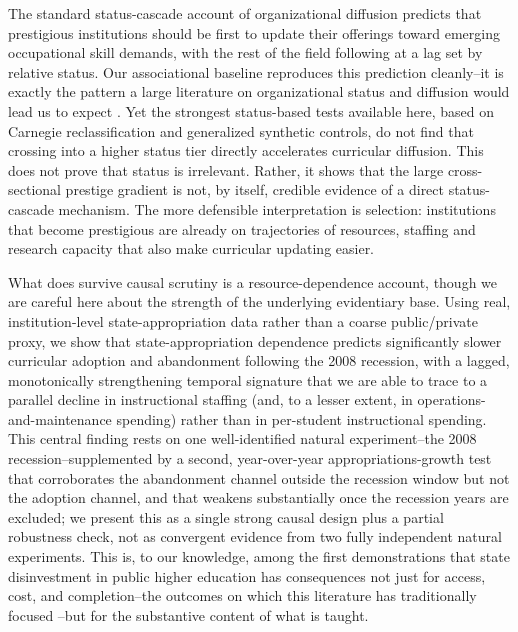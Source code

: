 \documentclass[11pt, letterpaper]{article}
\newcommand{\parencite}[1]{\cite{#1}}
\begin{document}
The standard status-cascade account of organizational diffusion predicts that prestigious institutions should be first to update their offerings toward emerging occupational skill demands, with the rest of the field following at a lag set by relative status. Our associational baseline reproduces this prediction cleanly--it is exactly the pattern a large literature on organizational status and diffusion would lead us to expect \parencite{podolny1993, phillipszuckerman2001, clauset2015}. Yet the strongest status-based tests available here, based on Carnegie reclassification and generalized synthetic controls, do not find that crossing into a higher status tier directly accelerates curricular diffusion. This does not prove that status is irrelevant. Rather, it shows that the large cross-sectional prestige gradient is not, by itself, credible evidence of a direct status-cascade mechanism. The more defensible interpretation is selection: institutions that become prestigious are already on trajectories of resources, staffing and research capacity that also make curricular updating easier.

What does survive causal scrutiny is a resource-dependence account, though we are careful here about the strength of the underlying evidentiary base. Using real, institution-level state-appropriation data rather than a coarse public/private proxy, we show that state-appropriation dependence predicts significantly slower curricular adoption and abandonment following the 2008 recession, with a lagged, monotonically strengthening temporal signature that we are able to trace to a parallel decline in instructional staffing (and, to a lesser extent, in operations-and-maintenance spending) rather than in per-student instructional spending. This central finding rests on one well-identified natural experiment--the 2008 recession--supplemented by a second, year-over-year appropriations-growth test that corroborates the abandonment channel outside the recession window but not the adoption channel, and that weakens substantially once the recession years are excluded; we present this as a single strong causal design plus a partial robustness check, not as convergent evidence from two fully independent natural experiments. This is, to our knowledge, among the first demonstrations that state disinvestment in public higher education has consequences not just for access, cost, and completion--the outcomes on which this literature has traditionally focused \parencite{demingwalters2017}--but for the substantive content of what is taught.
\end{document}
